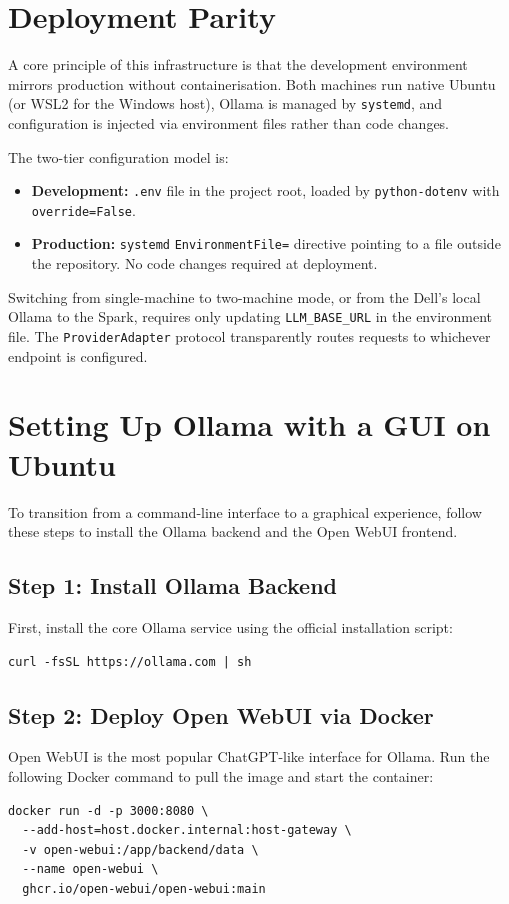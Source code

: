 \section{Deployment Parity}
\label{sec:parity}

A core principle of this infrastructure is that the development
environment mirrors production without containerisation. Both machines
run native Ubuntu (or WSL2 for the Windows host), Ollama is managed by
\texttt{systemd}, and configuration is injected via environment files
rather than code changes.

The two-tier configuration model is:

\begin{itemize}
  \item \textbf{Development:} \texttt{.env} file in the project root,
        loaded by \texttt{python-dotenv} with \texttt{override=False}.
  \item \textbf{Production:} \texttt{systemd} \texttt{EnvironmentFile=}
        directive pointing to a file outside the repository. No code
        changes required at deployment.
\end{itemize}

Switching from single-machine to two-machine mode, or from the Dell's
local Ollama to the Spark, requires only updating \texttt{LLM\_BASE\_URL}
in the environment file. The \texttt{ProviderAdapter} protocol
transparently routes requests to whichever endpoint is configured.

\section{Setting Up Ollama with a GUI on Ubuntu}

To transition from a command-line interface to a graphical experience, follow these steps to install the Ollama backend and the Open WebUI frontend.

\subsection{Step 1: Install Ollama Backend}
First, install the core Ollama service using the official installation script:
\begin{verbatim}
curl -fsSL https://ollama.com | sh
\end{verbatim}

\subsection{Step 2: Deploy Open WebUI via Docker}
Open WebUI is the most popular ChatGPT-like interface for Ollama. Run the following Docker command to pull the image and start the container:
\begin{verbatim}
docker run -d -p 3000:8080 \
  --add-host=host.docker.internal:host-gateway \
  -v open-webui:/app/backend/data \
  --name open-webui \
  ghcr.io/open-webui/open-webui:main
\end{verbatim}

